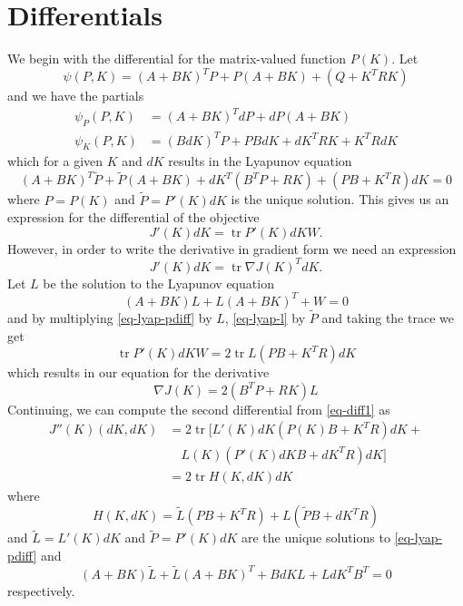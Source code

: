 \documentclass[12pt]{article}
\DeclareMathOperator*{\tr}{\mathrm{tr}}
\begin{document}
\section{Differentials}
We begin with the differential for the matrix-valued function $P(K)$. Let
\begin{equation}
\psi(P,K) = (A + BK)^TP + P(A + BK) + (Q + K^TRK)
\end{equation}
and we have the partials
\begin{equation}
\begin{split}
\psi_P(P,K) &= (A + BK)^TdP + dP(A + BK) \\
\psi_K(P,K) &= (BdK)^TP + PBdK + dK^TRK + K^TRdK
\end{split}
\end{equation}
which for a given $K$ and $dK$ results in the Lyapunov equation
\begin{equation}
\label{eq-lyap-pdiff}
(A + BK)^T\tilde{P} + \tilde{P}(A + BK) + dK^T(B^TP + RK) + (PB + K^TR)dK = 0
\end{equation}
where $P = P(K)$ and $\tilde{P} = P'(K)dK$ is the unique solution. This gives us an
expression for the differential of the objective
\begin{equation}
J'(K)dK = \tr P'(K)dKW.
\end{equation}
However, in order to write the derivative in gradient form we need an
expression
\begin{equation}
J'(K)dK = \tr \nabla J(K)^TdK.
\end{equation}
Let $L$ be the solution to the Lyapunov equation
\begin{equation}
\label{eq-lyap-l}
(A + BK)L + L(A + BK)^T + W = 0
\end{equation}
and by multiplying \eqref{eq-lyap-pdiff} by $L$, \eqref{eq-lyap-l} by $\tilde{P}$ and taking
the trace we get
\begin{equation}
\label{eq-diff1}
\tr P'(K) dKW = 2 \tr L(PB + K^TR)dK
\end{equation}
which results in our equation for the derivative
\begin{equation}
\nabla J(K) = 2(B^TP + RK)L
\end{equation}
Continuing, we can compute the second differential from \eqref{eq-diff1} as
\begin{equation}
\begin{split}
J''(K)(dK,dK) &= 2 \tr  [ L'(K)dK(P(K)B + K^TR)dK  + \\
&  \quad L(K)(P'(K)dKB + dK^TR)dK ] \\
&= 2 \tr H(K,dK) dK
\end{split}
\end{equation}
where
\begin{equation}
H(K,dK) = \tilde{L}(PB + K^TR) + L(\tilde{P}B + dK^TR)
\end{equation}
and $\tilde L = L'(K)dK$ and $\tilde P = P'(K) dK$ are the unique solutions to
\eqref{eq-lyap-pdiff} and
\begin{equation}
\label{eq-lyap-ldiff}
(A + BK)\tilde{L} + \tilde{L}(A + BK)^T + BdKL + LdK^TB^T = 0
\end{equation}
respectively.
\end{document}
